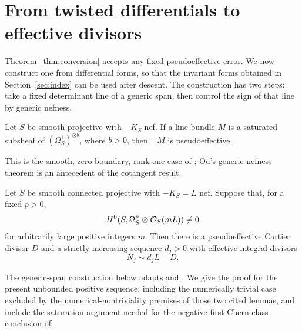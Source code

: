 \section{From twisted differentials to effective divisors}
\label{sec:differentials}
Theorem~\ref{thm:conversion} accepts any fixed pseudoeffective error.
We now construct one from differential forms, so that the invariant
forms obtained in Section~\ref{sec:index} can be used after descent.
The construction has two steps: take a fixed determinant line of a generic
span, then control the sign of that line by generic nefness.

\begin{theorem}\label{thm:subsheaf}
Let \(S\) be smooth projective with \(-K_S\) nef.
If a line bundle \(M\) is a saturated subsheaf of
\((\Omega_S^1)^{\otimes b}\), where \(b>0\), then \(-M\) is
pseudoeffective.
\end{theorem}

This is the smooth, zero-boundary, rank-one case of
\cite[Theorem~4.1]{LMPTX2023}; Ou's generic-nefness theorem
\cite[Theorem~1.4]{Ou2023} is an antecedent of the cotangent result.

\begin{lemma}\label{lem:determinant}
Let \(S\) be smooth connected projective with \(-K_S=L\) nef.
Suppose that, for a fixed \(p>0\),
\[
H^0(S,\Omega_S^p\otimes\mathcal O_S(mL))\ne0
\]
for arbitrarily large positive integers \(m\).
Then there is a pseudoeffective Cartier divisor \(D\) and a strictly
increasing sequence \(d_j>0\) with effective integral divisors
\[
N_j\sim d_jL-D.
\]
\end{lemma}

The generic-span construction below adapts
\cite[Lemma~4.1]{LP2018} and \cite[Lemma~5.1]{LMPTX2023}. We give the
proof for the present unbounded positive sequence, including the
numerically trivial case excluded by the numerical-nontriviality
premises of those two cited lemmas, and include the saturation argument needed
for the negative first-Chern-class conclusion of
\cite[Theorem~4.1]{LMPTX2023}.

